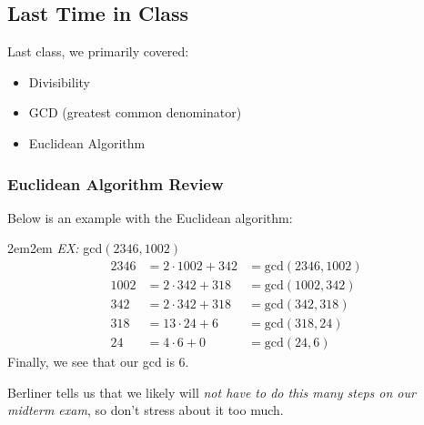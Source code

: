 \documentclass[10pt,oneside]{book}
\newcommand{\gspc}{\vspace{0.13cm}} %
\begin{document}
\newcommand{\cg}[1]{\color{OliveGreen}#1\color{white}}
\newcommand{\cb}[1]{\color{BlueViolet}#1\color{white}}


%
%
\subsection*{Last Time in Class}
Last class, we primarily covered:
\begin{itemize}[itemsep=0pt, parsep=0pt]
	\item Divisibility
	\item GCD (greatest common denominator)
	\item Euclidean Algorithm
\end{itemize}
\subsubsection*{Euclidean Algorithm Review}
Below is an example with the Euclidean algorithm:
\begin{adjustwidth}{2em}{2em}\gspc
	\textit{EX:} gcd$(2346, 1002)$ 
	\begin{align*}
		2346 &= 2\cdot 1002 + 342&=\text{gcd}(2346, 1002)\\
		1002 &= 2\cdot 342 + 318&=\text{gcd}(1002, 342)\\
		342 &= 2\cdot 342 + 318&=\text{gcd}(342, 318)\\
		318 &= 13\cdot 24 + 6&=\text{gcd}(318, 24)\\
		24 &= 4\cdot 6 + 0&=\text{gcd}(24, 6)
	\end{align*}
	Finally, we see that our gcd is 6. 
\end{adjustwidth}\gspc
Berliner tells us that we likely will \textit{not have to do this many steps on our midterm exam}, so don't stress about it too much.
%
%
\end{document}
